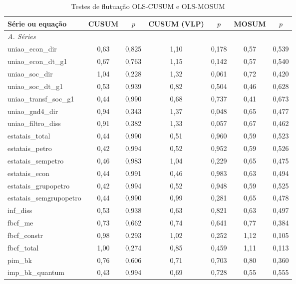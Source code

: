 \begin{table}[htbp]
\centering
\caption{Testes de flutua\c{c}\~ao OLS-CUSUM e OLS-MOSUM}
\label{tab:a4_cusum}
\scriptsize
\begin{tabular}{lcccccc}
\toprule
S\'erie ou equa\c{c}\~ao & CUSUM & $p$ & CUSUM (VLP) & $p$ & MOSUM & $p$ \\
\midrule
\multicolumn{7}{l}{\textit{A. S\'eries}} \\
uniao\_econ\_dir & 0{,}63 & 0{,}825 & 1{,}10 & 0{,}178 & 0{,}57 & 0{,}539 \\
uniao\_econ\_dt\_g1 & 0{,}67 & 0{,}763 & 1{,}15 & 0{,}142 & 0{,}57 & 0{,}540 \\
uniao\_soc\_dir & 1{,}04 & 0{,}228 & 1{,}32 & 0{,}061 & 0{,}72 & 0{,}420 \\
uniao\_soc\_dt\_g1 & 0{,}53 & 0{,}939 & 0{,}82 & 0{,}504 & 0{,}46 & 0{,}628 \\
uniao\_transf\_soc\_g1 & 0{,}44 & 0{,}990 & 0{,}68 & 0{,}737 & 0{,}41 & 0{,}673 \\
uniao\_gnd4\_dir & 0{,}94 & 0{,}343 & 1{,}37 & 0{,}048 & 0{,}65 & 0{,}477 \\
uniao\_filtro\_diss & 0{,}91 & 0{,}382 & 1{,}33 & 0{,}057 & 0{,}67 & 0{,}462 \\
estatais\_total & 0{,}44 & 0{,}990 & 0{,}51 & 0{,}960 & 0{,}59 & 0{,}523 \\
estatais\_petro & 0{,}42 & 0{,}994 & 0{,}52 & 0{,}952 & 0{,}59 & 0{,}526 \\
estatais\_sempetro & 0{,}46 & 0{,}983 & 1{,}04 & 0{,}229 & 0{,}65 & 0{,}475 \\
estatais\_econ & 0{,}44 & 0{,}991 & 0{,}46 & 0{,}983 & 0{,}63 & 0{,}494 \\
estatais\_grupopetro & 0{,}42 & 0{,}994 & 0{,}52 & 0{,}948 & 0{,}59 & 0{,}525 \\
estatais\_semgrupopetro & 0{,}44 & 0{,}990 & 0{,}99 & 0{,}281 & 0{,}65 & 0{,}478 \\
inf\_diss & 0{,}53 & 0{,}938 & 0{,}63 & 0{,}821 & 0{,}63 & 0{,}497 \\
fbcf\_me & 0{,}73 & 0{,}662 & 0{,}74 & 0{,}641 & 0{,}77 & 0{,}384 \\
fbcf\_constr & 0{,}98 & 0{,}293 & 1{,}02 & 0{,}252 & 1{,}12 & 0{,}105 \\
fbcf\_total & 1{,}00 & 0{,}274 & 0{,}85 & 0{,}459 & 1{,}11 & 0{,}113 \\
pim\_bk & 0{,}76 & 0{,}606 & 0{,}71 & 0{,}703 & 0{,}80 & 0{,}360 \\
imp\_bk\_quantum & 0{,}43 & 0{,}994 & 0{,}69 & 0{,}728 & 0{,}55 & 0{,}555 \\

\end{tabular}
\end{table}
